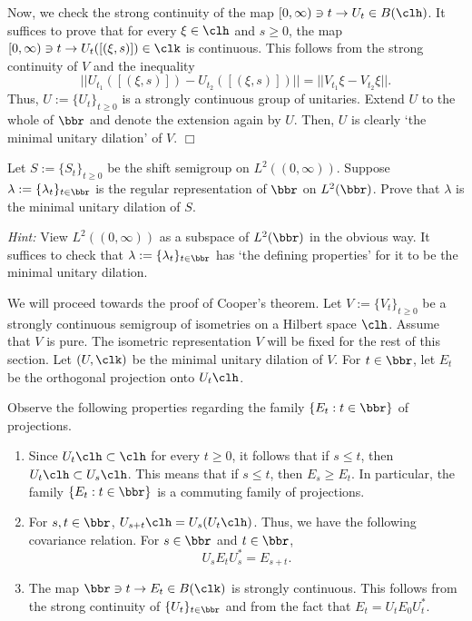 Now, we check the strong continuity of the map $[0,\infty) \ni t \to U_t \in B(\clh)$. It suffices to prove that for every $\xi \in \clh$ and $s \geq 0$, the map $[0,\infty) \ni t \to U_t([(\xi,s)]) \in \clk$ is continuous. This follows from the strong continuity of $V$ and the inequality 
\[
|| U_{t_1}([(\xi,s)])-U_{t_2}([(\xi,s)])||=||V_{t_1}\xi-V_{t_2}\xi||.\]
Thus, $U:=\{U_t\}_{t \geq 0}$ is a strongly continuous group of unitaries. Extend $U$ to the whole of $\bbr$ and denote the extension again by $U$. Then, $U$ is clearly `the minimal unitary dilation' of $V$. 
\hfill $\Box$

\begin{xrcs}
Let $S:=\{S_t\}_{t \geq 0}$ be the shift semigroup on $L^{2}((0,\infty))$. Suppose $\lambda:=\{\lambda_t\}_{t \in \bbr}$ is the regular representation of $\bbr$ on $L^{2}(\bbr)$. Prove that $\lambda$ is the minimal unitary dilation of $S$. 
\end{xrcs}
\textit{Hint:} View $L^{2}((0,\infty))$ as a subspace of $L^{2}(\bbr)$ in the obvious way. It suffices to check that $\lambda:=\{\lambda_t\}_{t \in \bbr}$ has `the defining properties' for it to be the minimal unitary dilation. 

We will proceed towards the proof of Cooper's theorem. Let $V:=\{V_t\}_{t \geq 0}$ be a strongly continuous semigroup of isometries on a Hilbert space $\clh$. Assume that $V$ is pure. The isometric representation $V$ will be fixed for the rest of this section. 
Let $(U,\clk)$ be the minimal unitary dilation of $V$. For $t \in \bbr$, let $E_t$ be the orthogonal projection onto $U_t\clh$. 

Observe the following properties regarding the family $\{E_t:t \in \bbr\}$ of projections. 
\begin{enumerate}
\item[(i)] Since $U_t\clh \subset \clh$ for every $ t\geq 0$, it follows that if $s\leq t$, then $U_t\clh \subset U_s\clh$. This means that if $s \leq t$, then $E_s \geq E_t$. In particular, the family $\{E_t: t \in \bbr\}$ is a commuting family of projections. 
\item[(ii)] For $s,t \in \bbr$, $U_{s+t}\clh=U_s(U_t\clh)$. Thus, we have the following covariance relation. For $s \in \bbr$ and $t \in \bbr$, 
\[
U_sE_tU_{s}^{*}=E_{s+t}.\]
\item[(iii)] The map $\bbr \ni t \to E_{t} \in B(\clk)$ is strongly continuous. This follows from the strong continuity of $\{U_t\}_{t \in \bbr}$ and from the fact that $E_t=U_tE_0U_{t}^{*}$. 
\end{enumerate}

